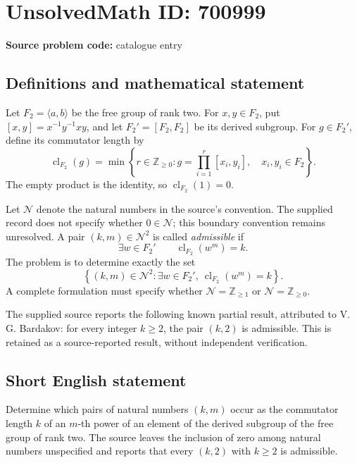 \documentclass[11pt]{article}
\newcommand{\Z}{\mathbb{Z}}
\begin{document}
\section*{UnsolvedMath ID: 700999}
\textbf{Source problem code:} catalogue entry
\subsection{Definitions and mathematical statement}
Let \(F_2=\langle a,b\rangle\) be the free group of rank two. For \(x,y\in F_2\), put \([x,y]=x^{-1}y^{-1}xy\), and let \(F_2'=[F_2,F_2]\) be its derived subgroup. For \(g\in F_2'\), define its commutator length by
\[
\operatorname{cl}_{F_2}(g)=\min\left\{r\in\Z_{\geq 0}:g=\prod_{i=1}^{r}[x_i,y_i],\quad x_i,y_i\in F_2\right\}.
\]
The empty product is the identity, so \(\operatorname{cl}_{F_2}(1)=0\).

Let \(\mathcal N\) denote the natural numbers in the source's convention. The supplied record does not specify whether \(0\in\mathcal N\); this boundary convention remains unresolved. A pair \((k,m)\in\mathcal N^2\) is called \emph{admissible} if
\[
\exists w\in F_2'\qquad \operatorname{cl}_{F_2}(w^m)=k.
\]
The problem is to determine exactly the set
\[
\left\{(k,m)\in\mathcal N^2:\exists w\in F_2',\ \operatorname{cl}_{F_2}(w^m)=k\right\}.
\]
A complete formulation must specify whether \(\mathcal N=\Z_{\geq1}\) or \(\mathcal N=\Z_{\geq0}\).

The supplied source reports the following known partial result, attributed to V. G. Bardakov: for every integer \(k\geq2\), the pair \((k,2)\) is admissible. This is retained as a source-reported result, without independent verification.
\subsection{Short English statement}
Determine which pairs of natural numbers \((k,m)\) occur as the commutator length \(k\) of an \(m\)-th power of an element of the derived subgroup of the free group of rank two. The source leaves the inclusion of zero among natural numbers unspecified and reports that every \((k,2)\) with \(k\geq2\) is admissible.
\end{document}
